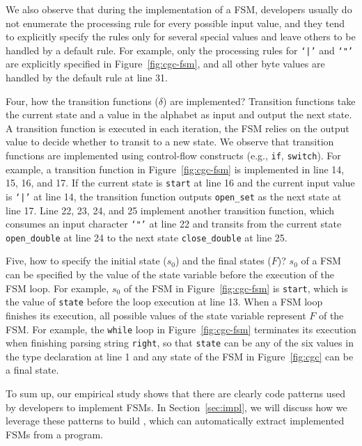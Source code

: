 We also observe that during the implementation of a FSM, 
developers usually do not enumerate the processing rule for every possible
input value, 
and they tend to explicitly specify the rules only for several special values
and leave others to be handled by a default rule. 
For example, only the processing rules for \texttt{`|'} and \texttt{`"'} 
are explicitly specified in Figure~\ref{fig:cgc-fsm}, 
and all other byte values are handled by 
the default rule at line 31. 

Four, how the transition functions ($\delta$) are implemented?
Transition functions take the current state and a value
in the alphabet as input and output the next state. 
A transition function is executed in each iteration, 
the FSM relies on the output value to decide whether to transit to a new state. 
We observe that transition functions are implemented
using control-flow constructs (e.g., \texttt{if}, \texttt{switch}). 
For example, a transition function in Figure~\ref{fig:cgc-fsm} 
is implemented in line 14, 15, 16, and 17. 
If the current state is \texttt{start} 
at line 16 and the current input value is 
\texttt{`|'} at line 14, the transition function outputs \texttt{open\_set}
as the next state at line 17. 
Line 22, 23, 24, and 25 implement another transition function,
which consumes an input character \texttt{`"'} at line 22 and 
transits from the current state 
\texttt{open\_double} at line 24 to 
the next state \texttt{close\_double} at line 25. 

Five, how to specify the initial state ($s_0$) and the final states ($F$)? 
$s_0$ of a FSM can be specified 
by the value of the state variable before the execution of the FSM loop.
For example,  $s_0$ of the FSM in Figure~\ref{fig:cgc-fsm}
is \texttt{start}, which is the value of \texttt{state} 
before the loop execution at line 13. 
When a FSM loop finishes its execution, 
all possible values of the state variable
represent $F$ of the FSM. 
For example, the \texttt{while} loop in Figure~\ref{fig:cgc-fsm} terminates 
its execution when finishing parsing string \texttt{right}, 
so that \texttt{state} can be any of the six values 
in the type declaration at line 1 
and any state of the FSM in 
Figure~\ref{fig:cgc} can be a final state. 


To sum up, our empirical study shows that 
there are clearly code patterns used by developers to implement FSMs. 
In Section~\ref{sec:impl}, we will discuss how we 
leverage these patterns to build \Tool{}, 
which can automatically extract implemented FSMs from a program. 





